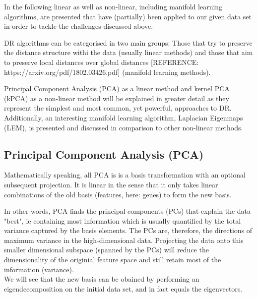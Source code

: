 \documentclass[journal, a4paper]{IEEEtran}
\begin{document}
In the following linear as well as non-linear, including manifold learning algorithms, are presented that have (partially) been applied to our given data set in order to tackle the challenges discussed above.

DR algorithms can be categorised in two main groups: Those that try to preserve the distance structure withi the data (usually linear methods) and those that aim to preserve local distances over global distances [REFERENCE: https://arxiv.org/pdf/1802.03426.pdf] (manifold learning methods).

Principal Component Analysis (PCA) as a linear method and kernel PCA (kPCA) as a non-linear method will be explained in greater detail as they represent the simplest and most common, yet powerful, approaches to DR.
Additionally, an interesting manifold learning algorithm, Laplacian Eigenmaps (LEM), is presented and discussed in comparison to other non-linear methods.


\subsection{Principal Component Analysis (PCA)}

Mathematically speaking, all PCA is is a basis transformation with an optional subsequent projection. It is linear in the sense that it only takes linear combinations of the old basis (features, here: genes) to form the new basis. 

In other words, PCA finds the principal components (PCs) that explain the data "best", ie containing most information which is usually quantified by the total variance captured by the basis elements. The PCs are, therefore, the directions of maximum variance in the high-dimensional data. Projecting the data onto this smaller dimensional subspace (spanned by the PCs) will reduce the dimensionality of the originial feature space and still retain most of the information (variance). \\
We will see that the new basis can be obained by performing an eigendecomposition on the initial data set, and in fact equals the eigenvectors.
\end{document}
